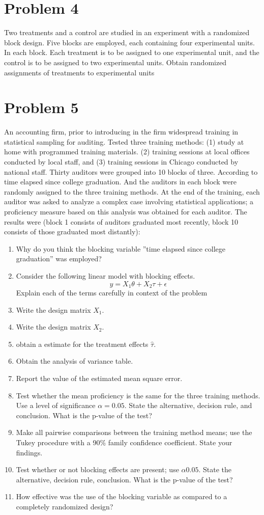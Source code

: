 \documentclass{article}
\begin{document}
\section{Problem 4}
Two treatments and a control are studied in an experiment with a randomized block design. Five
blocks are employed, each containing four experimental units. In each block. Each treatment is to
be assigned to one experimental unit, and the control is to be assigned to two experimental units.
Obtain randomized assignments of treatments to experimental units

\section{Problem 5}
An accounting firm, prior to introducing in the firm widespread training in statistical sampling for
auditing. Tested three training methods: (1) study at home with programmed training materials.
(2) training sessions at local offices conducted by local staff, and (3) training sessions in Chicago
conducted by national staff. Thirty auditors were grouped into 10 blocks of three. According to
time elapsed since college graduation. And the auditors in each block were randomly assigned to the
three training methods. At the end of the training, each auditor was asked to analyze a complex
case involving statistical applications; a proficiency measure based on this analysis was obtained
for each auditor. The results were (block 1 consists of auditors graduated most recently, block 10
consists of those graduated most distantly):
\begin{enumerate}
	\item Why do you think the blocking variable ”time elapsed since college graduation” was employed?
	\item Consider the following linear model with blocking effects.
	      $$
		      y= X_1 \theta + X_2 \tau + \epsilon
	      $$
	      Explain each of the terms carefully in context of the problem
	\item Write the design matrix $X_1$.
	\item Write the design matrix $X_2$.
	\item obtain a estimate for the treatment effects $\hat{\tau}$.
	\item Obtain the analysis of variance table.
	\item Report the value of the estimated mean square error.
	\item Test whether the mean proficiency is the same for the three training methods. Use a level of significance
	      $\alpha = 0.05$. State the alternative, decision rule, and conclusion. What is the p-value of the test?
	\item Make all pairwise comparisons between the training method means; use the Tukey procedure with a 90\% family
	      confidence coefficient. State your findings.
	\item Test whether or not blocking effects are present; use $\alpha 0.05$. State the alternative, decision rule,
	      conclusion. What is the p-value of the test?
	\item How effective was the use of the blocking variable as compared to a completely randomized design?
\end{enumerate}
\end{document}
